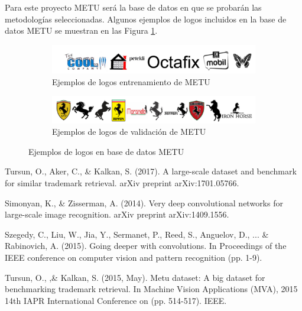 \documentclass[conference]{IEEEtran}
\begin{document}
Para este proyecto METU será la base de datos en que se probarán las metodologías seleccionadas. Algunos ejemplos de logos incluidos en la base de datos METU se muestran en las Figura \ref{fig:logosMatu}.

\begin{figure}[h!]
\centering
	\begin{subfigure}[b]{0.8\linewidth}
		\includegraphics[width=\linewidth]{images/metudataset.png}
		\caption{Ejemplos de logos entrenamiento de METU}
	\end{subfigure}

  	\begin{subfigure}[b]{0.8\linewidth}
		\includegraphics[width=\linewidth]{images/queriesmetu2}
		\caption{Ejemplos de logos de validación de METU}
  	 \end{subfigure}
  	\caption{Ejemplos de logos en base de datos METU}
  	\label{fig:logosMatu}
\end{figure} 

\begin{thebibliography}{00}

 Tursun, O., Aker, C., \& Kalkan, S. (2017). A large-scale dataset and benchmark for similar trademark retrieval. arXiv preprint arXiv:1701.05766.

 Simonyan, K., \& Zisserman, A. (2014). Very deep convolutional networks for large-scale image recognition. arXiv preprint arXiv:1409.1556.

 Szegedy, C., Liu, W., Jia, Y., Sermanet, P., Reed, S., Anguelov, D., ... \& Rabinovich, A. (2015). Going deeper with convolutions. In Proceedings of the IEEE conference on computer vision and pattern recognition (pp. 1-9).

 Tursun, O., ,\& Kalkan, S. (2015, May). Metu dataset: A big dataset for benchmarking trademark retrieval. In Machine Vision Applications (MVA), 2015 14th IAPR International Conference on (pp. 514-517). IEEE.

\end{thebibliography}
\end{document}
